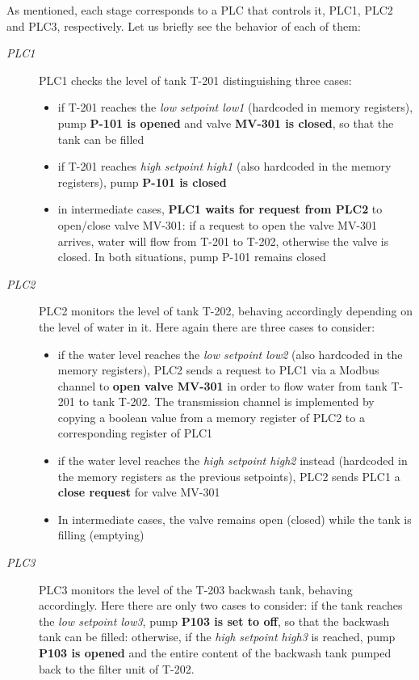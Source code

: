 \bigskip
As mentioned, each stage corresponds to a PLC that controls it, PLC1, PLC2 and PLC3, respectively. Let us briefly see the behavior of each of them:

\begin{description}
	\item[\textit{PLC1}] PLC1 checks the level of tank T-201 distinguishing three cases:
	
	\begin{itemize}
		\item if T-201 reaches the \textit{low setpoint low1} (hardcoded in memory registers), pump \textbf{P-101 is opened} and valve \textbf{MV-301 is closed}, so that the tank can be filled
		
		\item if T-201 reaches \textit{high setpoint high1} (also hardcoded in the memory registers), pump \textbf{P-101 is closed}
		
		\item in intermediate cases, \textbf{PLC1 waits for request from PLC2} to open/close valve MV-301: if a request to open the valve MV-301 arrives, water will flow from T-201 to T-202, otherwise the valve is closed. In both situations, pump P-101 remains closed 
	\end{itemize}

	\item[\textit{PLC2}] PLC2 monitors the level of tank T-202, behaving accordingly depending on the level of water in it. Here again there are three cases to consider:
	
	\begin{itemize}
		\item if the water level reaches the \textit{low setpoint low2} (also hardcoded in the memory registers), PLC2 sends a request to PLC1 via a Modbus channel to \textbf{open valve MV-301} in order to flow water from tank T-201 to tank T-202. The transmission channel is implemented by copying a boolean value from a memory register of PLC2 to a corresponding register of PLC1
		
		\item if the water level reaches the \textit{high setpoint high2} instead (hardcoded in the memory registers as the previous setpoints), PLC2 sends PLC1 a \textbf{close request} for valve MV-301
		
		\item In intermediate cases, the valve remains open (closed) while the tank is filling (emptying)
	\end{itemize}
	
	\item[\textit{PLC3}] PLC3 monitors the level of the T-203 backwash tank, behaving accordingly. Here there are only two cases to consider: if the tank reaches the \textit{low setpoint low3}, pump \textbf{P103 is set to off}, so that the backwash tank can be filled: otherwise, if the \textit{high setpoint high3} is reached, pump \textbf{P103 is opened} and the entire content of the backwash tank pumped back to the filter unit of T-202.
	 
\end{description} 

